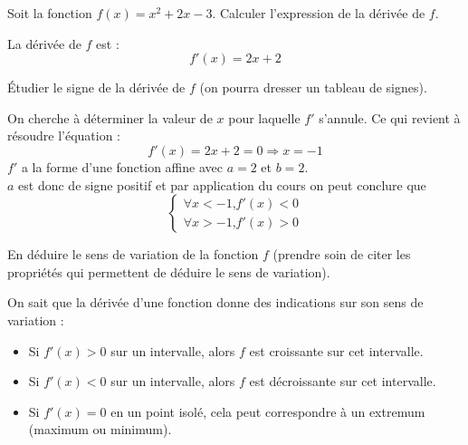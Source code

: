 \documentclass[answers]{exam}
\begin{document}
\begin{questions}

\question[1.5] Soit la fonction $f(x) = x^2 + 2x - 3$. Calculer l’expression de la dérivée de $f$.
\begin{solution}
  La dérivée de $f$ est :
  \[ f'(x) = 2x + 2 \]
  \end{solution}

\question[1.5] Étudier le signe de la dérivée de $f$ (on pourra dresser un tableau de signes).

\begin{solution}
  On cherche à déterminer la valeur de $x$ pour laquelle $f'$ s'annule. Ce qui revient à résoudre l'équation : \\
  \[
  f'(x) = 2x + 2 = 0 \Rightarrow x = -1
  \]
  $f'$ a la forme d'une fonction affine avec $a=2$ et $b=2$. \\
  $a$ est donc de signe positif et par application du cours on peut conclure que \\

  \[
  \begin{cases}
    \forall x < -1 \text{,} f'(x) < 0 \\
    \forall x > -1 \text{,} f'(x) > 0
  \end{cases}
\]


\end{solution}

\question[1] En déduire le sens de variation de la fonction $f$ (prendre soin de citer les propriétés qui permettent de déduire le sens de variation).

\begin{solution}
  On sait que la dérivée d'une fonction donne des indications sur son sens de variation :
  
  \begin{itemize}
    \item Si $f'(x) > 0$ sur un intervalle, alors $f$ est croissante sur cet intervalle.
    \item Si $f'(x) < 0$ sur un intervalle, alors $f$ est décroissante sur cet intervalle.
    \item Si $f'(x) = 0$ en un point isolé, cela peut correspondre à un extremum (maximum ou minimum).
  \end{itemize}


\end{solution}
\end{questions}
\end{document}

